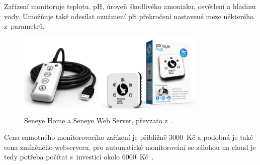             Zařízení monitoruje teplotu, pH, úroveň škodlivého amoniaku, osvětlení a hladinu vody. Umožňuje také odesílat oznámení při překročení nastavené meze některého z~parametrů.

            \begin{figure}[h!]
                \centering
                \includegraphics[width=0.8\textwidth]{obrazky/trh/seneye-home.jpg}
                \caption{Seneye Home a Seneye Web Server, převzato z~\cite{seneye-home}.}
                \label{fig:obrazky-trh-seneye-home-jpg}
            \end{figure}

            Cena samotného monitorovacího zařízení je přibližně \qty{3000}{Kč} a podobná je také cena zmíněného webserveru, pro automatické monitorování se zálohou na cloud je tedy potřeba počítat s~investicí okolo \qty{6000}{Kč}~\cite{seneye-home}.
            


        